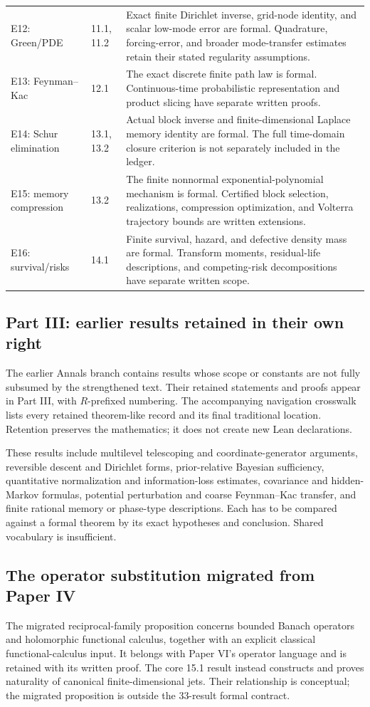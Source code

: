 \begin{longtable}{@{}p{.24\linewidth}p{.18\linewidth}p{.51\linewidth}@{}}
E12: Green/PDE & 11.1, 11.2 & Exact finite Dirichlet inverse, grid-node identity, and scalar low-mode error are formal. Quadrature, forcing-error, and broader mode-transfer estimates retain their stated regularity assumptions.\\
E13: Feynman--Kac & 12.1 & The exact discrete finite path law is formal. Continuous-time probabilistic representation and product slicing have separate written proofs.\\
E14: Schur elimination & 13.1, 13.2 & Actual block inverse and finite-dimensional Laplace memory identity are formal. The full time-domain closure criterion is not separately included in the ledger.\\
E15: memory compression & 13.2 & The finite nonnormal exponential-polynomial mechanism is formal. Certified block selection, realizations, compression optimization, and Volterra trajectory bounds are written extensions.\\
E16: survival/risks & 14.1 & Finite survival, hazard, and defective density mass are formal. Transform moments, residual-life descriptions, and competing-risk decompositions have separate written scope.\\
\bottomrule\end{longtable}

\subsection{Part III: earlier results retained in their own right}
The earlier Annals branch contains results whose scope or constants are not fully subsumed by the strengthened text. Their retained statements and proofs appear in Part III, with $R$-prefixed numbering. The accompanying navigation crosswalk lists every retained theorem-like record and its final traditional location. Retention preserves the mathematics; it does not create new Lean declarations.

These results include multilevel telescoping and coordinate-generator arguments, reversible descent and Dirichlet forms, prior-relative Bayesian sufficiency, quantitative normalization and information-loss estimates, covariance and hidden-Markov formulas, potential perturbation and coarse Feynman--Kac transfer, and finite rational memory or phase-type descriptions. Each has to be compared against a formal theorem by its exact hypotheses and conclusion. Shared vocabulary is insufficient.

\subsection{The operator substitution migrated from Paper IV}
The migrated reciprocal-family proposition concerns bounded Banach operators and holomorphic functional calculus, together with an explicit classical functional-calculus input. It belongs with Paper VI's operator language and is retained with its written proof. The core 15.1 result instead constructs and proves naturality of canonical finite-dimensional jets. Their relationship is conceptual; the migrated proposition is outside the 33-result formal contract.

